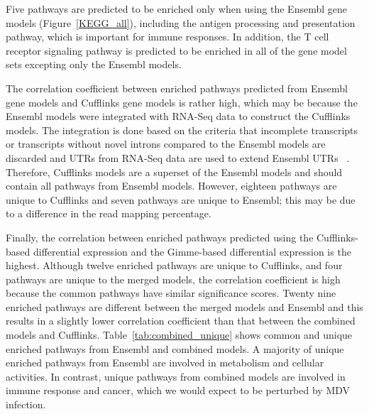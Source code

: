 Five pathways are predicted to be enriched only when using
the Ensembl gene models (Figure~\ref{KEGG_all}), including
the antigen processing and presentation pathway, which is
important for immune responses.  In addition, the T cell
receptor signaling pathway is predicted to be enriched in
all of the gene model sets excepting only the Ensembl
models.

The correlation coefficient between enriched pathways
predicted from Ensembl gene models and Cufflinks gene models
is rather high, which may be because the Ensembl models were
integrated with RNA-Seq data to construct the Cufflinks
models.  The integration is done based on the criteria that
incomplete transcripts or transcripts without novel introns
compared to the Ensembl models are discarded and UTRs from
RNA-Seq data are used to extend Ensembl UTRs
~\cite{roberts2011identification}.  Therefore, Cufflinks
models are a superset of the Ensembl models and should
contain all pathways from Ensembl models.  However, eighteen
pathways are unique to Cufflinks and seven pathways are
unique to Ensembl; this may be due to a difference in the
read mapping percentage.

Finally, the correlation between enriched pathways predicted
using the Cufflinks-based differential expression and the
Gimme-based differential expression is the highest.
Although twelve enriched pathways are unique to Cufflinks,
and four pathways are unique to the merged models, the
correlation coefficient is high because the common pathways
have similar significance scores.  Twenty nine enriched
pathways are different between the merged models and Ensembl
and this results in a slightly lower correlation coefficient
than that between the combined models and Cufflinks.
Table~\ref{tab:combined_unique} shows common and unique
enriched pathways from Ensembl and combined models.  A
majority of unique enriched pathways from Ensembl are
involved in metabolism and cellular activities.
In contrast, unique pathways from combined models are
involved in immune response and cancer, which we would
expect to be perturbed by MDV infection.

